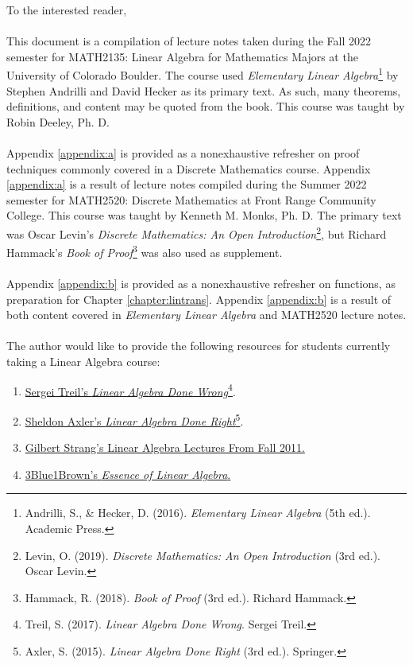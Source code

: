 To the interested reader,
\\
\\
This document is a compilation of lecture notes taken during the Fall 2022 semester for MATH2135: Linear Algebra for Mathematics Majors at the University of Colorado Boulder. The course used \textit{Elementary Linear Algebra}\footnote{Andrilli, S., \& Hecker, D. (2016). \textit{Elementary Linear Algebra} (5th ed.). Academic Press.} by Stephen Andrilli and David Hecker as its primary text. As such, many theorems, definitions, and content may be quoted from the book. This course was taught by Robin Deeley, Ph. D.
\\
\\
Appendix \ref{appendix:a} is provided as a nonexhaustive refresher on proof techniques commonly covered in a Discrete Mathematics course. Appendix \ref{appendix:a} is a result of lecture notes compiled during the Summer 2022 semester for MATH2520: Discrete Mathematics at Front Range Community College. This course was taught by Kenneth M. Monks, Ph. D. The primary text was Oscar Levin's \textit{Discrete Mathematics: An Open Introduction}\footnote{Levin, O. (2019). \textit{Discrete Mathematics: An Open Introduction} (3rd ed.). Oscar Levin.}, but Richard Hammack's \textit{Book of Proof}\footnote{Hammack, R. (2018). \textit{Book of Proof} (3rd ed.). Richard Hammack.} was also used as supplement.
\\
\\
Appendix \ref{appendix:b} is provided as a nonexhaustive refresher on functions, as preparation for Chapter \ref{chapter:lintrans}. Appendix \ref{appendix:b} is a result of both content covered in \textit{Elementary Linear Algebra} and MATH2520 lecture notes.
\\
\\
The author would like to provide the following resources for students currently taking a Linear Algebra course:
\begin{enumerate}
    \item \href{https://www.math.brown.edu/streil/papers/LADW/LADW_2017-09-04.pdf}{Sergei Treil's \textit{Linear Algebra Done Wrong}}\footnote{Treil, S. (2017). \textit{Linear Algebra Done Wrong}. Sergei Treil.}.
    \item \href{https://link.springer.com/book/10.1007/978-3-319-11080-6?utm_medium=affiliate&utm_source=commission_junction_authors&utm_campaign=CONR_BOOKS_ECOM_GL_PHSS_ALWYS_DEEPLINK&utm_content=deeplink&utm_term=PID100197440&CJEVENT=f9f74b076a4c11ed80fe023d0a1c0e0d}{Sheldon Axler's \textit{Linear Algebra Done Right}}\footnote{Axler, S. (2015). \textit{Linear Algebra Done Right} (3rd ed.). Springer. }.
    \item \href{https://youtube.com/playlist?list=PL221E2BBF13BECF6C}{Gilbert Strang's Linear Algebra Lectures From Fall 2011.}
    \item \href{https://www.youtube.com/playlist?app=desktop&list=PLZHQObOWTQDPD3MizzM2xVFitgF8hE_ab}{3Blue1Brown's \textit{Essence of Linear Algebra}.}
\end{enumerate}
